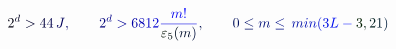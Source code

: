 \documentclass[12pt]{article}
\begin{document}
\makeatletter
\renewcommand*{\@textcolor}[3]{%
  \protect\leavevmode
  \begingroup
    \color#1{#2}#3%
  \endgroup
}
\makeatother
\begin{displaymath}
\mathcolor[RGB]{0,0,15}{2} ^ { \mathcolor[RGB]{0,0,30}{d} } \mathcolor[RGB]{0,0,45}{>} \mathcolor[RGB]{0,0,60}{4} \mathcolor[RGB]{0,0,75}{4} \, \mathcolor[RGB]{0,0,90}{J} \mathcolor[RGB]{0,0,105}{,} \qquad \mathcolor[RGB]{0,0,120}{2} ^ { \mathcolor[RGB]{0,0,135}{d} } \mathcolor[RGB]{0,0,150}{>} \mathcolor[RGB]{0,0,165}{6} \mathcolor[RGB]{0,0,180}{8} \mathcolor[RGB]{0,0,195}{1} \mathcolor[RGB]{0,0,210}{2} \mathcolor[RGB]{0,0,225}{\frac { \mathcolor[RGB]{0,0,240}{m} \mathcolor[RGB]{0,0,255}{!} } { \mathcolor[RGB]{0,15,0}{\varepsilon} _ { \mathcolor[RGB]{0,15,15}{5} } \mathcolor[RGB]{0,15,30}{(} \mathcolor[RGB]{0,15,45}{m} \mathcolor[RGB]{0,15,60}{)} } } \mathcolor[RGB]{0,15,75}{,} \qquad \mathcolor[RGB]{0,15,90}{0} \mathcolor[RGB]{0,15,105}{\leq} \mathcolor[RGB]{0,15,120}{m} \mathcolor[RGB]{0,15,135}{\leq} \mathcolor[RGB]{0,15,150}{\operatorname*} { \mathcolor[RGB]{0,15,165}{m} \mathcolor[RGB]{0,15,180}{i} \mathcolor[RGB]{0,15,195}{n} } \mathcolor[RGB]{0,15,210}{(} \mathcolor[RGB]{0,15,225}{3} \mathcolor[RGB]{0,15,240}{L} \mathcolor[RGB]{0,15,255}{-} \mathcolor[RGB]{0,30,0}{3} \mathcolor[RGB]{0,30,15}{,} \mathcolor[RGB]{0,30,30}{2} \mathcolor[RGB]{0,30,45}{1} \mathcolor[RGB]{0,30,60}{)}
\end{displaymath}
\end{document}
